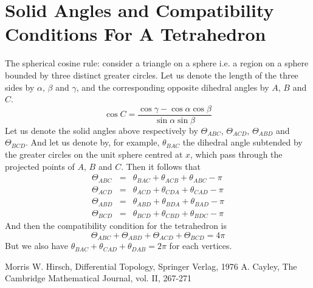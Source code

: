 \documentclass{article}
\begin{document}
\section{Solid Angles and Compatibility Conditions For A Tetrahedron}
\label{sec-6}
The spherical cosine rule:
consider a triangle on a sphere i.e. a region on a sphere bounded by three distinct greater circles. Let us denote the length of the three sides by $\alpha$, $\beta$ and $\gamma$, and the corresponding opposite dihedral angles by $A$, $B$ and $C$.
\begin{equation}
\label{ }
\cos{C} = \frac{\cos{\gamma} - \cos{\alpha}\cos{\beta} }{\sin{\alpha}\sin{\beta}}
\end{equation}
Let us denote the solid angles above respectively by $\Theta_{ABC}$, $\Theta_{ACD}$, $\Theta_{ABD}$ and $\Theta_{BCD}$. And let us denote by, for example, $\theta_{BAC}$ the dihedral angle subtended by the greater circles on the unit sphere centred at $x$, which pass through the projected points of $A$, $B$ and $C$. Then it follows that 
\begin{eqnarray}
\Theta_{ABC} & = & \theta_{BAC} + \theta_{ACB} + \theta_{ABC} - \pi \\
\Theta_{ACD} & = & \theta_{ACD} + \theta_{CDA} + \theta_{CAD} - \pi \\
\Theta_{ABD} & = & \theta_{ABD} + \theta_{BDA} + \theta_{BAD} - \pi \\
\Theta_{BCD} & = & \theta_{BCD} + \theta_{CBD} + \theta_{BDC} - \pi 
\end{eqnarray}
And then the compatibility condition for the tetrahedron is
\begin{equation}
\label{ }
\Theta_{ABC} + \Theta_{ABD} + \Theta_{ACD} + \Theta_{BCD} = 4\pi
\end{equation}
But we also have $\theta_{BAC} + \theta_{CAD} + \theta_{DAB} = 2\pi$ for each vertices.
\begin{thebibliography}{10}
  Morris W. Hirsch, Differential Topology, Springer Verlag, 1976
  A. Cayley, The Cambridge Mathematical Journal, vol. II, 267-271
\end{thebibliography}
\end{document}
